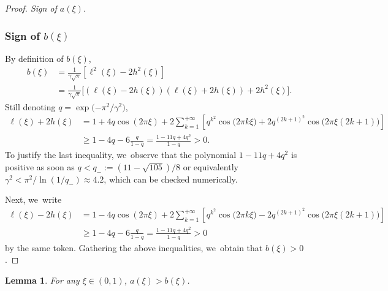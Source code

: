 \documentclass[10pt]{amsart}
\newtheorem{lemme}[theorem]{Lemma}
\theoremstyle{definition}
\let\EE\exp
\newcommand{\pa}[1]{\left(#1\right)}
\newcommand{\pac}[1]{\left[#1\right]}
\newcommand{\bpac}[1]{\bigl[#1\bigr]}
\begin{document}
\begin{proof}[Proof. Sign of $a(\xi)$]
\subsubsection*{Sign of $b(\xi)$} By definition of $b(\xi)$,
\begin{align}
b(\xi) &= \frac{1}{\gamma\sqrt{\pi}}\pac{\ell^2(\xi)-2h^2(\xi)} \nonumber \\
&= \frac{1}{\gamma\sqrt{\pi}}\bpac{\pa{\ell(\xi)-2h(\xi)}\pa{\ell(\xi)+2h(\xi)}+2h^2(\xi)}.\label{form_bxi}
\end{align}
Still denoting $q= \EE\bigl({-{\pi^2}/{\gamma^2}}\bigr)$,
\begin{align*}
\ell(\xi) + 2 h(\xi) &= 1 + 4q\cos\pa{2\pi\xi} + 2\sum_{k=1}^{+\infty}\pac{q^{k^2}\cos\bigl({2\pi k\xi}\bigr)+2q^{(2k+1)^2}\cos\bigl(2\pi\xi(2k+1)\bigr)} \\
&\geq 1 -4q -6\frac{q}{1-q} = \frac{1-11q+4q^2}{1-q} >0.
\end{align*}
To justify the last inequality, we~observe that the polynomial $1-11q+4q^2$ is positive as soon as $q < q_-:= ({11-\sqrt{105}})/{8}$ or equivalently $\gamma^2 < {\pi^2}/\ln(1/q_-) \approx 4.2$, which can be checked numerically.

Next, we~write
\begin{align*}
\ell(\xi) - 2 h(\xi) &= 1 - 4q\cos\pa{2\pi\xi} + 2\sum_{k=1}^{+\infty}\pac{q^{k^2}\cos\bigl({2\pi k\xi}\bigr)-2q^{(2k+1)^2}\cos\bigl(2\pi\xi(2k+1)\bigr)} \\
&\geq 1 -4q -6\frac{q}{1-q} = \frac{1-11q+4q^2}{1-q} >0
\end{align*}
by the same token. Gathering the above inequalities, we~obtain that $b(\xi)>0$.
\end{proof}

\begin{lemme}
For any $\xi \in (0,1)$, $a(\xi) > b(\xi)$.
\end{lemme}
\end{document}
